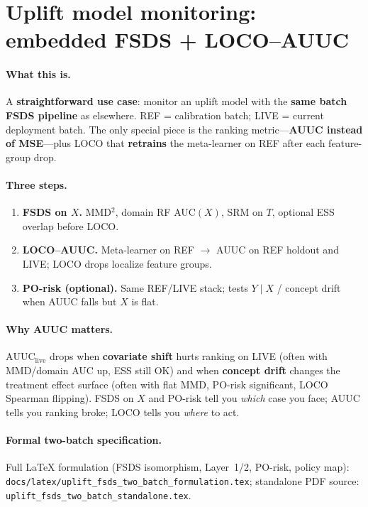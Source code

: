 
\section{Uplift model monitoring: embedded FSDS + LOCO--AUUC}

\paragraph{What this is.}
A \textbf{straightforward use case}: monitor an uplift model with the \textbf{same batch FSDS pipeline} as elsewhere.
REF = calibration batch; LIVE = current deployment batch.
The only special piece is the ranking metric---\textbf{AUUC instead of MSE}---plus LOCO that \textbf{retrains} the meta-learner on REF after each feature-group drop.

\paragraph{Three steps.}
\begin{enumerate}\itemsep4pt
  \item \textbf{FSDS on $X$.} MMD$^2$, domain RF AUC$(X)$, SRM on $T$, optional ESS overlap before LOCO.
  \item \textbf{LOCO--AUUC.} Meta-learner on REF $\rightarrow$ AUUC on REF holdout and LIVE; LOCO drops localize feature groups.
  \item \textbf{PO-risk (optional).} Same REF/LIVE stack; tests $Y\mid X$ / concept drift when AUUC falls but $X$ is flat.
\end{enumerate}

\paragraph{Why AUUC matters.}
$\mathrm{AUUC}_{\mathrm{live}}$ drops when \textbf{covariate shift} hurts ranking on LIVE (often with MMD/domain AUC up, ESS still OK)
and when \textbf{concept drift} changes the treatment effect surface (often with flat MMD, PO-risk significant, LOCO Spearman flipping).
FSDS on $X$ and PO-risk tell you \emph{which} case you face; AUUC tells you ranking broke; LOCO tells you \emph{where} to act.

\paragraph{Formal two-batch specification.}
Full LaTeX formulation (FSDS isomorphism, Layer~1/2, PO-risk, policy map):
\verb|docs/latex/uplift_fsds_two_batch_formulation.tex|;
standalone PDF source: \verb|uplift_fsds_two_batch_standalone.tex|.






